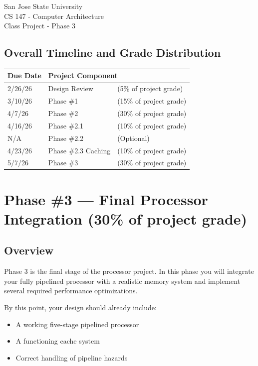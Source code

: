 \documentclass[12pt]{article}
\begin{document}
\begin{center}
{\LARGE San Jose State University}\\[0.5em]
{\LARGE CS 147 - Computer Architecture}\\[0.5em]
{\LARGE Class Project - Phase 3}
\end{center}

\vspace{2em}

\subsection*{Overall Timeline and Grade Distribution}
\begin{center}
\begin{tabular}{|l|l|l|}
\hline
\textbf{Due Date} & \multicolumn{2}{l|}{\textbf{Project Component}} \\
\hline
2/26/26 & Design Review & (5\% of project grade) \\
\hline
3/10/26 & Phase \#1 & (15\% of project grade) \\
\hline
4/7/26 & Phase \#2 & (30\% of project grade) \\
\hline
4/16/26 & Phase \#2.1 & (10\% of project grade) \\
\hline
N/A & Phase \#2.2 & (Optional) \\
\hline
4/23/26 & Phase \#2.3 Caching & (10\% of project grade) \\
\hline
\rowcolor{black!8}
5/7/26 & Phase \#3 & (30\% of project grade) \\
\hline
\end{tabular}
\end{center}

\section*{Phase \#3 --- Final Processor Integration (30\% of project grade)}

\subsection*{Overview}

Phase 3 is the final stage of the processor project. In this phase you will integrate your
fully pipelined processor with a realistic memory system and implement several required
performance optimizations.

By this point, your design should already include:

\begin{itemize}
\item A working five-stage pipelined processor
\item A functioning cache system
\item Correct handling of pipeline hazards
\end{itemize}
\end{document}
